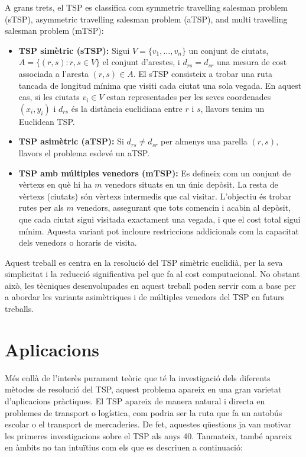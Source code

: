 \documentclass[a4paper,12pt,twoside]{ThesisStyle}
\begin{document}
\medskip

A grans trets, el TSP es classifica com symmetric travelling salesman problem (sTSP), asymmetric travelling salesman problem (aTSP), and multi travelling salesman problem (mTSP):
\begin{itemize}
  \item \textbf{TSP simètric (sTSP):} Sigui \( V = \{ v_1, \dots, v_n \} \) un conjunt de ciutats, \( A = \{ (r,s) : r,s \in V \} \) el conjunt d'arestes, i \( d_{rs} = d_{sr} \) una mesura de cost associada a l'aresta \( (r,s) \in A \). El sTSP consisteix a trobar una ruta tancada de longitud mínima que visiti cada ciutat una sola vegada. En aquest cas, si les ciutats \( v_i \in V \) estan representades per les seves coordenades \( (x_i, y_i) \) i \( d_{rs} \) és la distància euclidiana entre \( r \) i \( s \), llavors tenim un Euclidean TSP.
  \item \textbf{TSP asimètric (aTSP):} Si \( d_{rs} \neq d_{sr} \) per almenys una parella \( (r,s) \), llavors el problema esdevé un aTSP.
  \item \textbf{TSP amb múltiples venedors (mTSP):} Es defineix com un conjunt de vèrtexs en què hi ha \( m \) venedors situats en un únic depòsit. La resta de vèrtexs (ciutats) són vèrtexs intermedis que cal visitar. L'objectiu és trobar rutes per als \( m \) venedors, assegurant que tots comencin i acabin al depòsit, que cada ciutat sigui visitada exactament una vegada, i que el cost total sigui mínim. Aquesta variant pot incloure restriccions addicionals com la capacitat dels venedors o horaris de visita.
\end{itemize}

\medskip

Aquest treball es centra en la resolució del TSP simètric euclidià, per la seva simplicitat i la reducció significativa pel que fa al cost computacional. No obstant això, les tècniques desenvolupades en aquest treball poden servir com a base per a abordar les variants asimètriques i de múltiples venedors del TSP en futurs treballs.


\section{Aplicacions}
\label{Aplicacions}

Més enllà de l'interès purament teòric que té la investigació dels diferents mètodes de resolució del TSP, aquest problema apareix en una gran varietat d'aplicacions pràctiques. El TSP apareix de manera natural i directa en problemes de transport o logística, com podria ser la ruta que fa un autobús escolar o el transport de mercaderies. De fet, aquestes qüestions ja van motivar les primeres investigacions sobre el TSP als anys 40. Tanmateix, també apareix en àmbits no tan intuïtius com els que es descriuen a continuació:
\end{document}

